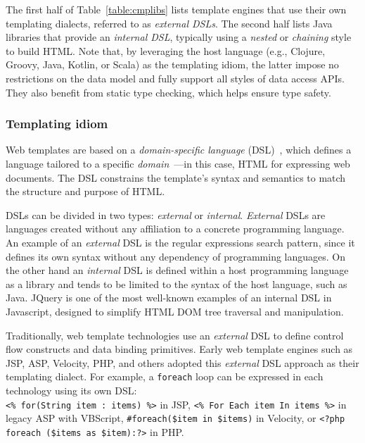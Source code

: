 The first half of Table~\ref{table:cmplibs} lists template engines that use
their own templating dialects, referred to as \textit{external DSLs}. The
second half lists Java libraries that provide an \textit{internal DSL},
typically using a \textit{nested} or \textit{chaining} style to build HTML.
Note that, by leveraging the host language (e.g., Clojure, Groovy, Java,
Kotlin, or Scala) as the templating idiom, the latter impose no restrictions on
the data model and fully support all styles of data access APIs. They also
benefit from static type checking, which helps ensure type safety.


\subsubsection{Templating idiom}

Web templates are based on a \textit{domain-specific language}
(DSL)~\cite{landin1966next}, which defines a language tailored to a specific
\textit{domain}~\cite{evans2004domain}—in this case, HTML for expressing web
documents. The DSL constrains the template's syntax and semantics to match the
structure and purpose of HTML.

DSLs can be divided in two types: \textit{external} or
\textit{internal}\cite{dslbook}. \textit{External} DSLs are languages created
without any affiliation to a concrete programming language. An example of an
\textit{external} DSL is the regular expressions search
pattern\cite{thompson1968}, since it defines its own syntax without any
dependency of programming languages. On the other hand an \textit{internal} DSL
is defined within a host programming language as a library and tends to be
limited to the syntax of the host language, such as Java.
JQuery\cite{resig2007pro} is one of the most well-known examples of an internal
DSL in Javascript, designed to simplify HTML DOM\cite{dom} tree traversal and
manipulation.

Traditionally, web template technologies use an \textit{external} DSL to define
control flow constructs and data binding primitives. Early web template engines
such as JSP, ASP, Velocity, PHP, and others adopted this \textit{external} DSL
approach as their templating dialect. For example, a \texttt{foreach} loop can
be expressed in each technology using its own DSL: \\\texttt{<\% for(String
  item : items) \%>} in JSP, \texttt{<\% For Each item In items \%>} in legacy
ASP with VBScript, \texttt{\#foreach(\$item in \$items)} in Velocity, or
\texttt{<?php foreach (\$items as \$item):?>} in PHP.

